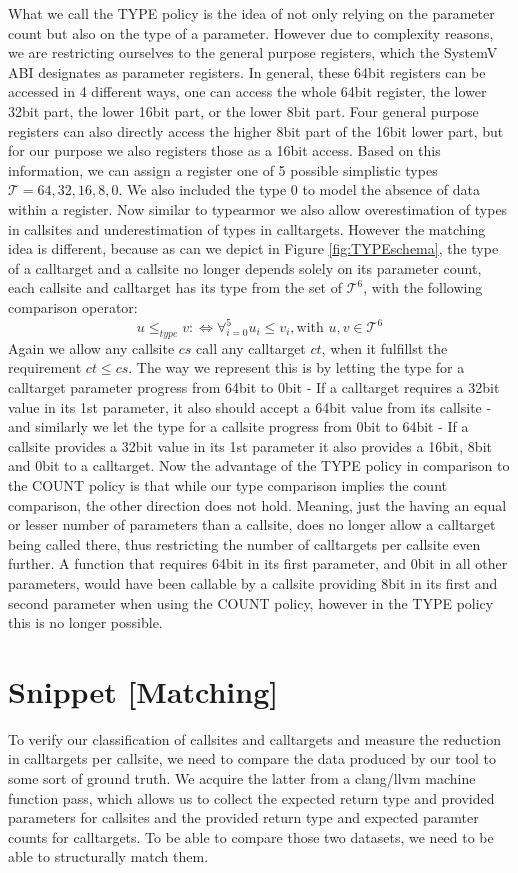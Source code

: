 What we call the TYPE policy is the idea of not only relying on the parameter count but also on the type of a parameter. However due to complexity reasons, we are restricting ourselves to the general purpose registers, which the SystemV ABI designates as parameter registers. In general, these 64bit registers can be accessed in 4 different ways, one can access the whole 64bit register, the lower 32bit part, the lower 16bit part, or the lower 8bit part. Four general purpose registers can also directly access the higher 8bit part of the 16bit lower part, but for our purpose we also registers those as a 16bit access. Based on this information, we can assign a register one of 5 possible simplistic types $\mathcal{T} = {64, 32, 16, 8, 0}$. We also included the type 0 to model the absence of data within a register. Now similar to typearmor we also allow overestimation of types in callsites and underestimation of types in calltargets. However the matching idea is different, because as can we depict in Figure \ref{fig:TYPEschema}, the type of a calltarget and a callsite no longer depends solely on its parameter count, each callsite and calltarget has its type from the set of $\mathcal{T}^6$, with the following comparison operator:
\[
	u \leq_{type} v :\Longleftrightarrow  \forall_{i = 0}^{5} {u_i \leq v_i} , \text {with } u, v \in \mathcal{T}^6
\]
Again we allow any callsite $cs$ call any calltarget $ct$, when it fulfillst the requirement $ct \leq cs$. The way we represent this is by letting the type for a calltarget parameter progress from 64bit to 0bit - If a calltarget requires a 32bit value in its 1st parameter, it also should accept a 64bit value from its callsite - and similarly we let the type for a callsite progress from 0bit to 64bit - If a callsite provides a 32bit value in its 1st parameter it also provides a 16bit, 8bit and 0bit to a calltarget. Now the advantage of the TYPE policy in comparison to the COUNT policy is that while our type comparison implies the count comparison, the other direction does not hold. Meaning, just the having an equal or lesser number of parameters than a callsite, does no longer allow a calltarget being called there, thus restricting the number of calltargets per callsite even further. A function that requires 64bit in its first parameter, and 0bit in all other parameters, would have been callable by a callsite providing 8bit in its first and second parameter when using the COUNT policy, however in the TYPE policy this is no longer possible.


\chapter{Snippet [Matching]}
To verify our classification of callsites and calltargets and measure the reduction in calltargets per callsite, we need to compare the data produced by our tool to some sort of ground truth. We acquire the latter from a clang/llvm machine function pass, which allows us to collect the expected return type and provided parameters for callsites and the provided return type and expected paramter counts for calltargets. To be able to compare those two datasets, we need to be able to structurally match them.

